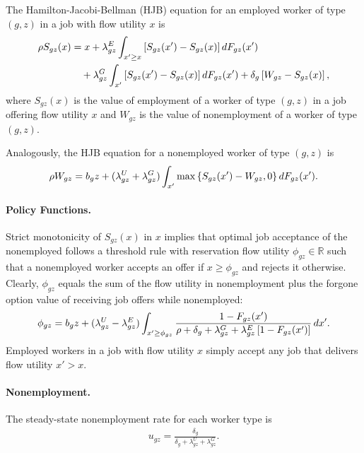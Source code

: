 The Hamilton-Jacobi-Bellman (HJB) equation for an employed worker of type $(g, z)$ in a job with flow utility $x$ is
%
\begin{align}
    \rho S_{gz}(x) &= x + \lambda_{gz}^{E} \int_{x' \ge x} \left[ S_{gz}(x') - S_{gz}(x) \right] \mathop{}\!{d} F_{gz}(x') \notag \\
    &\quad + \lambda_{gz}^{G} \int_{x'} \left[ S_{gz}(x') - S_{gz}(x) \right] \mathop{}\!{d} F_{gz}(x') + \delta_{g} \left[ W_{gz} - S_{gz}(x) \right], \label{eq:value_emp}
\end{align}
%
where $S_{gz}(x)$ is the value of employment of a worker of type $(g, z)$ in a job offering flow utility $x$ and $W_{gz}$ is the value of nonemployment of a worker of type $(g, z)$.

Analogously, the HJB equation for a nonemployed worker of type $(g, z)$ is
%
\begin{align}
    \rho W_{gz} = b_{g} z + (\lambda_{gz}^{U} + \lambda_{gz}^{G}) \int_{x'} \max \left\{ S_{gz}(x') - W_{gz}, 0 \right\} \mathop{}\!{d} F_{gz}(x') . \label{eq:value_unemp}
\end{align}
%


\paragraph{Policy Functions.}

Strict monotonicity of $S_{gz}(x)$ in $x$ implies that optimal job acceptance of the nonemployed follows a threshold rule with reservation flow utility $\phi_{gz} \in \mathbb{R}$ such that a nonemployed worker accepts an offer if $x \ge \phi_{gz}$ and rejects it otherwise. Clearly, $\phi_{gz}$ equals the sum of the flow utility in nonemployment plus the forgone option value of receiving job offers while nonemployed:
%
\begin{align}
    \phi_{gz} = b_{g} z + (\lambda_{gz}^{U} - \lambda_{gz}^{E}) \int_{x' \ge \phi_{gz}} \frac{1 - F_{gz}(x')}{\rho + \delta_{g} + \lambda_{gz}^{G} + \lambda_{gz}^{E} \left[1 - F_{gz}(x')\right]} \mathop{}\!{d} x'. \label{eq:outsideoption}
\end{align}
%
Employed workers in a job with flow utility $x$ simply accept any job that delivers flow utility $x' > x$.


\paragraph{Nonemployment.}

The steady-state nonemployment rate for each worker type is
%
\begin{align}
    u_{gz} = \frac{\delta_{g}}{\delta_{g} + \lambda_{gz}^{U} + \lambda_{gz}^{G}}. \label{eq:market_unemployment}
\end{align}
%


